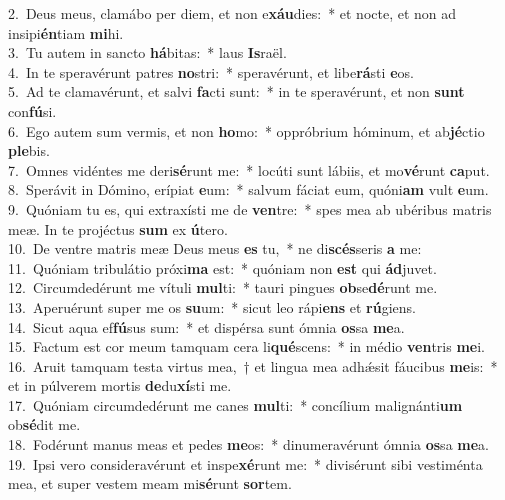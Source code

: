 {2.~}Deus meus, clamábo per diem, et non e\textbf{xáu}dies:~* et nocte, et non ad insipi\textbf{én}tiam \textbf{mi}hi.\\
{3.~}Tu autem in sancto \textbf{há}bitas:~* laus \textbf{Is}raël.\\
{4.~}In te speravérunt patres \textbf{no}stri:~* speravérunt, et libe\textbf{rá}sti \textbf{e}os.\\
{5.~}Ad te clamavérunt, et salvi \textbf{fa}cti sunt:~* in te speravérunt, et non \textbf{sunt} con\textbf{fú}si.\\
{6.~}Ego autem sum vermis, et non \textbf{ho}mo:~* oppróbrium hóminum, et ab\textbf{jé}ctio \textbf{ple}bis.\\
{7.~}Omnes vidéntes me deri\textbf{sé}runt me:~* locúti sunt lábiis, et mo\textbf{vé}runt \textbf{ca}put.\\
{8.~}Sperávit in Dómino, erípiat \textbf{e}um:~* salvum fáciat eum, quóni\textbf{am} vult \textbf{e}um.\\
{9.~}Quóniam tu es, qui extraxísti me de \textbf{ven}tre:~* spes mea ab ubéribus matris meæ. In te projéctus \textbf{sum} ex \textbf{ú}tero.\\
{10.~}De ventre matris meæ Deus meus \textbf{es} tu,~* ne di\textbf{scés}seris \textbf{a} me:\\
{11.~}Quóniam tribulátio próxi\textbf{ma} est:~* quóniam non \textbf{est} qui \textbf{ád}juvet.\\
{12.~}Circumdedérunt me vítuli \textbf{mul}ti:~* tauri pingues \textbf{ob}se\textbf{dé}runt me.\\
{13.~}Aperuérunt super me os \textbf{su}um:~* sicut leo rápi\textbf{ens} et \textbf{rú}giens.\\
{14.~}Sicut aqua ef\textbf{fú}sus sum:~* et dispérsa sunt ómnia \textbf{os}sa \textbf{me}a.\\
{15.~}Factum est cor meum tamquam cera li\textbf{qué}scens:~* in médio \textbf{ven}tris \textbf{me}i.\\
{16.~}Aruit tamquam testa virtus mea,~† et lingua mea adhǽsit fáucibus \textbf{me}is:~* et in púlverem mortis \textbf{de}du\textbf{xí}sti me.\\
{17.~}Quóniam circumdedérunt me canes \textbf{mul}ti:~* concílium malignánti\textbf{um} ob\textbf{sé}dit me.\\
{18.~}Fodérunt manus meas et pedes \textbf{me}os:~* dinumeravérunt ómnia \textbf{os}sa \textbf{me}a.\\
{19.~}Ipsi vero consideravérunt et inspe\textbf{xé}runt me:~* divisérunt sibi vestiménta mea, et super vestem meam mi\textbf{sé}runt \textbf{sor}tem.\\
